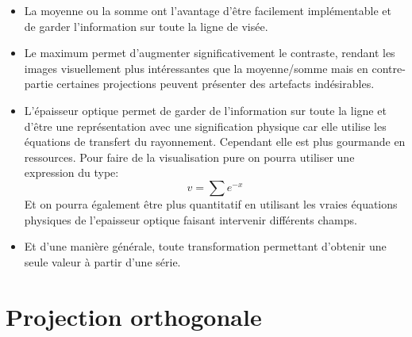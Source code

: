 \begin{itemize}
\item La moyenne ou la somme ont l'avantage d'être facilement implémentable et de garder l'information sur toute la ligne de visée.

\item Le maximum permet d'augmenter significativement le contraste, rendant les images visuellement plus intéressantes que la moyenne/somme mais en contre-partie certaines projections peuvent présenter des artefacts indésirables.

\item L'épaisseur optique permet de garder de l'information sur toute la ligne et d'être une représentation avec une signification physique car elle utilise les équations de transfert du rayonnement.
Cependant elle est plus gourmande en ressources.
Pour faire de la visualisation pure on pourra utiliser une expression du type:
\begin{equation}
v= \sum e^{-x}
\label{eq:epop}
\end{equation}
Et on pourra également être plus quantitatif en utilisant les vraies équations physiques de l'epaisseur optique faisant intervenir différents champs. %

\item Et d'une manière générale, toute transformation permettant d'obtenir une seule valeur à partir d'une série.

\end{itemize}




\section{Projection orthogonale}

